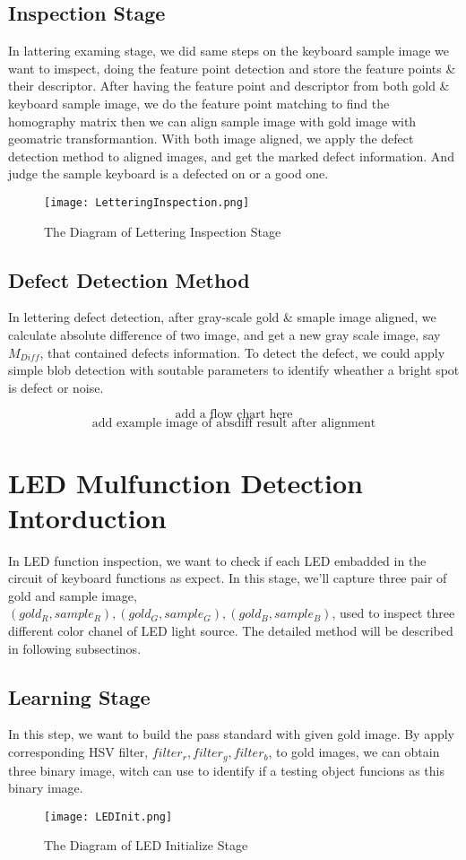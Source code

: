	\subsection{Inspection Stage}
		In lattering examing stage, we did same steps on the keyboard sample image we want to imspect, doing the feature point detection and store the feature points \& their descriptor.
		After having the feature point and descriptor from both gold \& keyboard sample image, we do the feature point matching to find the homography matrix then we can align sample image with gold image with geomatric transformantion. 
		With both image aligned, we apply the defect detection method to aligned images, and get the marked defect information.
		And judge the sample keyboard is a defected on or a good one.
		\begin{figure}
			\texttt{[image: LetteringInspection.png]}
			\caption{The Diagram of Lettering Inspection Stage}
			\label{fig:LetteringInspection}
		\end{figure}

	\subsection{Defect Detection Method}
		In lettering defect detection, after gray-scale gold \& smaple image aligned, we calculate absolute difference of two image, and get a new gray scale image, say $M_{Diff}$, that contained defects information.
		To detect the defect, we could apply simple blob detection with soutable parameters to identify wheather a bright spot is defect or noise.
		
		$$ \textrm{add a flow chart here} $$
		$$ \textrm{add example image of absdiff result after alignment} $$

\section{LED Mulfunction Detection Intorduction}
	In LED function inspection, we want to check if each LED embadded in the circuit of keyboard functions as expect.
	In this stage, we'll capture three pair of gold and sample image, $(gold_R, sample_R), (gold_G, sample_G), (gold_B, sample_B)$, used to inspect three different color chanel of LED light source.
	The detailed method will be described in following subsectinos.
	\subsection{Learning Stage}
		In this step, we want to build the pass standard with given gold image.
		By apply corresponding HSV filter, $filter_r, filter_g, filter_b$, to gold images, we can obtain three binary image, witch can use to identify if a testing object funcions as this binary image.
		\begin{figure}
			\texttt{[image: LEDInit.png]}
			\caption{The Diagram of LED Initialize Stage}
			\label{fig:LEDInit}
		\end{figure}

